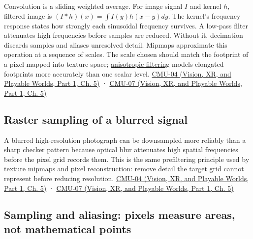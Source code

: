 Convolution is a sliding weighted average. For image signal \(I\) and kernel \(h\), filtered image is \((I*h)(x)=\int I(y)h(x-y)dy\). The kernel's frequency response states how strongly each sinusoidal frequency survives. A low-pass filter attenuates high frequencies before samples are reduced. Without it, decimation discards samples and aliases unresolved detail. Mipmaps approximate this operation at a sequence of scales. The scale chosen should match the footprint of a pixel mapped into texture space; \hyperref[appendix-d5b3c692d9f0]{anisotropic filtering} models elongated footprints more accurately than one scalar level. \href{../07-Vision-XR-and-Playable-Worlds-P01/main.pdf\#nameddest=04-visual-computing-ii-ch036-cmu-04---drawing-a-triangle-and-an-intro-to-sampling}{CMU-04 (Vision, XR, and Playable Worlds, Part 1, Ch. 5)} · \href{../07-Vision-XR-and-Playable-Worlds-P01/main.pdf\#nameddest=04-visual-computing-ii-ch036-cmu-07---perspective-projection-and-texture-mapping}{CMU-07 (Vision, XR, and Playable Worlds, Part 1, Ch. 5)}

\subsection{Raster sampling of a blurred signal}\label{03-visual-computing-i-ch003-raster-sampling-of-a-blurred-signal}

\hypertarget{03-visual-computing-i-ch003-raster-sampling-of-a-blurred-signal}{}

A blurred high-resolution photograph can be downsampled more reliably than a sharp checker pattern because optical blur attenuates high spatial frequencies before the pixel grid records them. This is the same prefiltering principle used by texture mipmaps and pixel reconstruction: remove detail the target grid cannot represent before reducing resolution. \href{../07-Vision-XR-and-Playable-Worlds-P01/main.pdf\#nameddest=04-visual-computing-ii-ch036-cmu-04---drawing-a-triangle-and-an-intro-to-sampling}{CMU-04 (Vision, XR, and Playable Worlds, Part 1, Ch. 5)} · \href{../07-Vision-XR-and-Playable-Worlds-P01/main.pdf\#nameddest=04-visual-computing-ii-ch036-cmu-07---perspective-projection-and-texture-mapping}{CMU-07 (Vision, XR, and Playable Worlds, Part 1, Ch. 5)}

\subsection{Sampling and aliasing: pixels measure areas, not mathematical points}\label{03-visual-computing-i-ch003-sampling-and-aliasing-pixels-measure-areas-not-mathematical-points}

